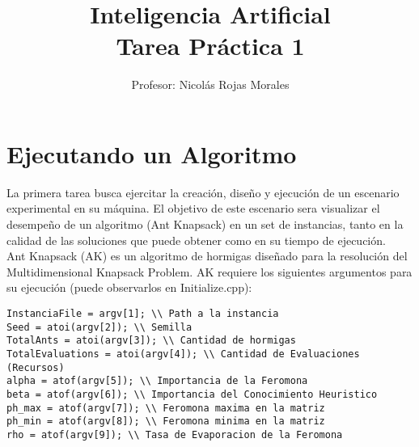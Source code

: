 \documentclass[12pt,spanish,letter]{article}
\title{\Large \bf
Inteligencia Artificial\\ Tarea Pr\'actica 1}
\author{Profesor: Nicol\'as Rojas Morales\\}
\affil{\textit{Universidad T\'ecnica Federico Santa Mar\'ia, \\ Departamento de Inform\'atica. }}
\date{\normalsize }
\begin{document}
\thispagestyle{fancy}
\maketitle
\thispagestyle{plain}
\let\oldthefootnote\thefootnote
\renewcommand{\thefootnote}{\fnsymbol{footnote}}
\let\thefootnote\oldthefootnote
\setlength{\headheight}{0.65in}
\setlength{\textheight}{8.60in}
\pagestyle{myheadings}

\renewcommand{\tablename}{Tabla} 
\renewcommand{\figurename}{{\bf \emph{Figura}}} 
\maketitle

\section{Ejecutando un Algoritmo}

La primera tarea busca ejercitar la creaci\'on, dise\~no y ejecuci\'on de un escenario experimental en su m\'aquina.
El objetivo de este escenario
sera visualizar el desempe\~no de un algoritmo (Ant Knapsack)
en un set de instancias, tanto en la calidad de las soluciones que puede obtener como en su tiempo de ejecuci\'on. \\

Ant Knapsack (AK) es un algoritmo de hormigas dise\~nado para la resoluci\'on del Multidimensional Knapsack Problem.
AK requiere los siguientes argumentos para su ejecuci\'on (puede observarlos en Initialize.cpp):
\begin{verbatim}
InstanciaFile = argv[1]; \\ Path a la instancia
Seed = atoi(argv[2]); \\ Semilla 
TotalAnts = atoi(argv[3]); \\ Cantidad de hormigas
TotalEvaluations = atoi(argv[4]); \\ Cantidad de Evaluaciones (Recursos)
alpha = atof(argv[5]); \\ Importancia de la Feromona
beta = atof(argv[6]); \\ Importancia del Conocimiento Heuristico
ph_max = atof(argv[7]); \\ Feromona maxima en la matriz
ph_min = atof(argv[8]); \\ Feromona minima en la matriz
rho = atof(argv[9]); \\ Tasa de Evaporacion de la Feromona
\end{verbatim}
\end{document}
